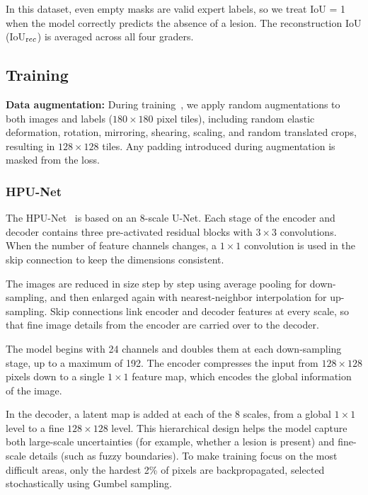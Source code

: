 \documentclass{article}
\begin{document}
In this dataset, even empty masks are valid expert labels, so we treat IoU = 1 when the model correctly predicts the absence of a lesion. The reconstruction IoU (IoU$_{\text rec}$)  is averaged across all four graders.

\subsection{Training}

\textbf{Data augmentation:}   
During training~\cite{Kohl2019}, we apply random augmentations to both images and labels
($180 \times 180$ pixel tiles), including random elastic deformation, rotation, mirroring, shearing, scaling, and random translated crops, resulting in $128 \times 128$ tiles. Any padding introduced during augmentation is masked from the loss. 

\subsubsection{HPU-Net}
  
The HPU-Net~\cite{Kohl2019} is based on an 8-scale U-Net. Each stage of the encoder and decoder contains three pre-activated residual blocks with $3 \times 3$ convolutions. When the number of feature channels changes, a $1 \times 1$ convolution is used in the skip connection to keep the dimensions consistent.  

The images are reduced in size step by step using average pooling for down-sampling, and then enlarged again with nearest-neighbor interpolation for up-sampling. Skip connections link encoder and decoder features at every scale, so that fine image details from the encoder are carried over to the decoder.  

The model begins with 24 channels and doubles them at each down-sampling stage, up to a maximum of 192. The encoder compresses the input from $128 \times 128$ pixels down to a single $1 \times 1$ feature map, which encodes the global information of the image.  

In the decoder, a latent map is added at each of the 8 scales, from a global $1 \times 1$ level to a fine $128 \times 128$ level. This hierarchical design helps the model capture both large-scale uncertainties (for example, whether a lesion is present) and fine-scale details (such as fuzzy boundaries). To make training focus on the most difficult areas, only the hardest 2\% of pixels are backpropagated, selected stochastically using Gumbel sampling.  
\end{document}
